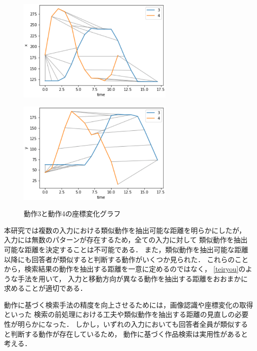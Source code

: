 \documentclass[11pt]{jreport}
\begin{document}
\begin{figure}[H]
    \centering
    \begin{minipage}{0.45\linewidth}
        \centering
        \includegraphics[height=5cm]{3-4-x.eps}
        \label{3-4-x}
    \end{minipage}
    \hspace{0.04\columnwidth}
    \begin{minipage}{0.45\linewidth}
        \centering
        \includegraphics[height=5cm]{3-4-y.eps}
        \label{3-4-y}
    \end{minipage}
    \hspace{0.04\columnwidth}
    \caption{動作3と動作4の座標変化グラフ}
    \label{3-4}
\end{figure}

本研究では複数の入力における類似動作を抽出可能な距離を明らかにしたが，
入力には無数のパターンが存在するため，全ての入力に対して
類似動作を抽出可能な距離を決定することは不可能である．
また，類似動作を抽出可能な距離以降にも回答者が類似すると判断する動作がいくつか見られた．
これらのことから，検索結果の動作を抽出する距離を一意に定めるのではなく，
\ref{teiryou}のような手法を用いて，
入力と移動方向が異なる動作を抽出する距離をおおまかに求めることが適切である．

動作に基づく検索手法の精度を向上させるためには，画像認識や座標変化の取得といった
検索の前処理における工夫や類似動作を抽出する距離の見直しの必要性が明らかになった．
しかし，いずれの入力においても回答者全員が類似すると判断する動作が存在しているため，
動作に基づく作品検索は実用性があると考える．
\end{document}
